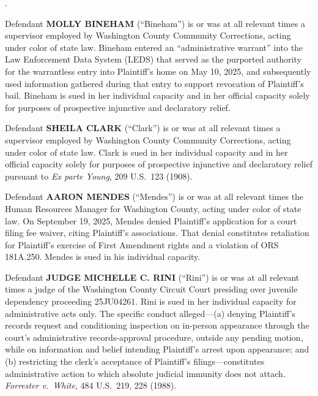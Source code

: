 \documentclass[12pt,letterpaper]{article}
\newcounter{complaintpara}
\newenvironment{paras}{%
	\begin{list}{\arabic{complaintpara}.}{%
			\setlength{\leftmargin}{0.5in}%
			\setlength{\labelwidth}{0.4in}%
			\setlength{\labelsep}{0.1in}%
			\setlength{\itemsep}{0pt}%
			\setlength{\parsep}{0pt}%
			\setlength{\topsep}{6pt}%
		}%
	}{%
	\end{list}%
}
\begin{document}
\begin{paras}
		\item Defendant \textbf{MOLLY BINEHAM} (``Bineham'') is or was at
		all relevant times a supervisor employed by Washington County
		Community Corrections, acting under color of state law. Bineham
		entered an ``administrative warrant'' into the Law Enforcement Data
		System (LEDS) that served as the purported authority for the
		warrantless entry into Plaintiff's home on May 10, 2025, and
		subsequently used information gathered during that entry to support
		revocation of Plaintiff's bail. Bineham is sued in her individual
		capacity and in her official capacity solely for purposes of
		prospective injunctive and declaratory relief.
		
		\item Defendant \textbf{SHEILA CLARK} (``Clark'') is or was at all
		relevant times a supervisor employed by Washington County Community
		Corrections, acting under color of state law. Clark is sued in her
		individual capacity and in her official capacity solely for purposes
		of prospective injunctive and declaratory relief pursuant to
		\textit{Ex parte Young}, 209 U.S.\ 123 (1908).
		
		\item Defendant \textbf{AARON MENDES} (``Mendes'') is or was at all
		relevant times the Human Resources Manager for Washington County,
		acting under color of state law. On September 19, 2025, Mendes
		denied Plaintiff's application for a court filing fee waiver, citing
		Plaintiff's associations. That denial constitutes retaliation for
		Plaintiff's exercise of First Amendment rights and a violation of
		ORS 181A.250. Mendes is sued in his individual capacity.
		
		\item Defendant \textbf{JUDGE MICHELLE C. RINI} (``Rini'') is or was
		at all relevant times a judge of the Washington County Circuit Court
		presiding over juvenile dependency proceeding 25JU04261. Rini is
		sued in her individual capacity for administrative acts only. The
		specific conduct alleged---(a) denying Plaintiff's records request
		and conditioning inspection on in-person appearance through the
		court's administrative records-approval procedure, outside any
		pending motion, while on information and belief intending
		Plaintiff's arrest upon appearance; and (b) restricting the clerk's
		acceptance of Plaintiff's filings---constitutes administrative
		action to which absolute judicial immunity does not attach.
		\textit{Forrester v.\ White}, 484 U.S.\ 219, 228 (1988).
		

\end{paras}
\end{document}
